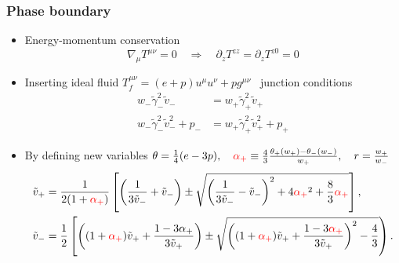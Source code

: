 \begin{frame}
    \frametitle{Phase boundary}
    \begin{itemize}
        \item Energy-momentum conservation
        \begin{equation}
            \nabla_\mu T^{\mu\nu} = 0
            \quad \Rightarrow \quad
            \partial_z T^{zz} = \partial_z T^{z0} = 0
        \end{equation}
        \item Inserting ideal fluid $T^{\mu \nu}_f = (e+p) u^\mu u^\nu + p g^{\mu \nu}$ \textrightarrow \ junction conditions
        \begin{align}
            w_- \tilde{\gamma}_-^2 \tilde{v}_- &= w_+ \tilde{\gamma}_+^2 \tilde{v}_+
            \label{eq:junction_condition_1} \\
            w_- \tilde{\gamma}_-^2 \tilde{v}_-^2 + p_- &= w_+ \tilde{\gamma}_+^2 \tilde{v}_+^2 + p_+
            \label{eq:junction_condition_2}
        \end{align}
        \item By defining new variables $\theta = \frac{1}{4}(e-3p), \quad \textcolor{red}{\alpha_+} \equiv \frac{4}{3} \frac{\theta_+(w_+) - \theta_-(w_-)}{w_+}, \quad r = \frac{w_+}{w_-}$
        \begin{align}
            \tilde{v}_+ &= \frac{1}{2(1+\textcolor{red}{\alpha_+})}\left[ \left(\frac{1}{3\tilde{v}_-}+\tilde{v}_-\right) \pm \sqrt{\left(\frac{1}{3\tilde{v}_-} - \tilde{v}_- \right)^2 + 4\textcolor{red}{\alpha_+}^2 + \frac{8}{3} \textcolor{red}{\alpha_+}} \right],
            \label{eq:v_tilde_plus}
            \\
            \tilde{v}_- &= \frac{1}{2} \left[ \left( (1+\textcolor{red}{\alpha_+})\tilde{v}_+ + \frac{1-3\alpha_+}{3\tilde{v}_+} \right) \pm \sqrt{\left((1+\textcolor{red}{\alpha_+})\tilde{v}_+ + \frac{1-3\textcolor{red}{\alpha_+}}{3\tilde{v}_+} \right)^2 - \frac{4}{3}} \right).
            \label{eq:v_tilde_minus}
        \end{align}
    \end{itemize}
\end{frame}

